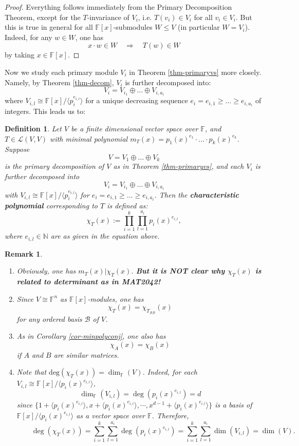 \documentclass[12pt]{amsbook}
\newtheorem{definition}[theorem]{Definition}
\newtheorem{remark}[theorem]{Remark}
\begin{document}
\begin{proof}
   Everything follows immediately from the Primary Decomposition Theorem, except for the $T$-invariance of $V_i$, i.e. $T(v_i) \in V_i$ for all $v_i \in V_i$. 
    But this is true in general for all $\mathbb{F}[x]$-submodules $W \leq V$ (in particular $W = V_i$). Indeed, for any $w \in W$, one has
   $$x \cdot w \in W \quad \Rightarrow \quad  T(w) \in W$$
   by taking $x \in \mathbb{F}[x]$.
\end{proof}


Now we study each primary module $V_i$ in Theorem \ref{thm-primaryvs} more closely. Namely, by Theorem \ref{thm-decom}, $V_i$ is further decomposed into:
$$V_i = V_{i_1} \oplus \dots \oplus V_{i,a_i}$$
where $V_{i,l} \cong \mathbb{F}[x]/\langle p_i^{e_{i,l}} \rangle$ for 
a unique decreasing sequence $e_i = e_{i,1} \geq \dots \geq e_{i,a_i}$ of integers. This leads us to:
\begin{definition}
    Let $V$ be a finite dimensional vector space over $\mathbb{F}$, and $T \in \mathcal{L}(V,V)$ with minimal polynomial $m_T(x) = p_1(x)^{e_1} \cdot \dots \cdot p_k(x)^{e_k}$. Suppose
    $$V = V_1 \oplus \dots \oplus V_k$$
    is the primary decomposition of $V$ as in Theorem \ref{thm-primaryvs}, and each $V_i$ is further decomposed into 
    $$V_i = V_{i_1} \oplus \dots \oplus V_{i,a_i}$$ 
    with $V_{i,l} \cong \mathbb{F}[x]/\langle p_i^{e_{i,l}} \rangle$ for $e_i = e_{i,1} \geq \dots \geq e_{i,a_i}$. Then the {\bf characteristic polynomial} corresponding to $T$ is defined as:
    $$\chi_T(x) := \prod_{i = 1}^k \prod_{l = 1}^{a_i} p_i(x)^{e_{i,l}},$$
    where $e_{i,l} \in \mathbb{N}$ are as given in the equation above.
\end{definition}

\begin{remark}
    \begin{enumerate}
        \item Obviously, one has $m_T(x) | \chi_T(x)$. {\bf But it is NOT clear why $\chi_T(x)$ is related to determinant as in MAT2042!}
        \item Since $V \cong \mathbb{F}^n$ as $\mathbb{F}[x]$-modules, one has $$\chi_T(x) = \chi_{T_{\mathcal{B}\mathcal{B}}}(x)$$
        for any ordered basis $\mathcal{B}$ of $V$.
        \item As in Corollary \ref{cor-minpolyconj}, one also has
        $$ \chi_{A}(x) = \chi_{B}(x)$$
        if $A$ and $B$ are similar matrices.
        \item Note that $\mathrm{deg}(\chi_{T}(x)) = \dim_{\mathbb{F}}(V)$. Indeed, for each $V_{i,l} \cong \mathbb{F}[x]/\langle p_i(x)^{e_{i,l}} \rangle$, 
        $$\dim_{\mathbb{F}}(V_{i,l}) = \deg(p_i(x)^{e_{i,l}}) = d$$
        since $\{1 + \langle p_i(x)^{e_{i,l}} \rangle, x + \langle p_i(x)^{e_{i,l}} \rangle, \cdots, x^{d-1} + \langle p_i(x)^{e_{i,l}} \rangle\}$ is a basis of $\mathbb{F}[x]/\langle p_i(x)^{e_{i,l}} \rangle$ as a vector space over $\mathbb{F}$. Therefore,
        $$\quad \quad \deg(\chi_T(x)) = \sum_{i=1}^k \sum_{l=1}^{a_i} \deg(p_i(x)^{e_{i,l}}) = \sum_{i=1}^k \sum_{l=1}^{a_i} \dim(V_{i,l}) = \dim(V).$$
    \end{enumerate}
\end{remark}
\end{document}
